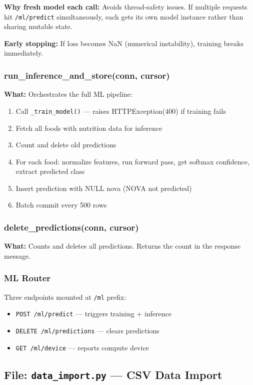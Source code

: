 \documentclass[12pt,a4paper]{article}
\begin{document}
\textbf{Why fresh model each call:} Avoids thread-safety issues. If multiple requests hit \texttt{/ml/predict} simultaneously, each gets its own model instance rather than sharing mutable state.

\textbf{Early stopping:} If loss becomes NaN (numerical instability), training breaks immediately.

\subsubsection{run\_inference\_and\_store(conn, cursor)}
\textbf{What:} Orchestrates the full ML pipeline:
\begin{enumerate}[nosep]
    \item Call \texttt{\_train\_model()} — raises HTTPException(400) if training fails
    \item Fetch all foods with nutrition data for inference
    \item Count and delete old predictions
    \item For each food: normalize features, run forward pass, get softmax confidence, extract predicted class
    \item Insert prediction with NULL nova (NOVA not predicted)
    \item Batch commit every 500 rows
\end{enumerate}

\subsubsection{delete\_predictions(conn, cursor)}
\textbf{What:} Counts and deletes all predictions. Returns the count in the response message.

\subsubsection{ML Router}
Three endpoints mounted at \texttt{/ml} prefix:
\begin{itemize}[nosep]
    \item \texttt{POST /ml/predict} — triggers training + inference
    \item \texttt{DELETE /ml/predictions} — clears predictions
    \item \texttt{GET /ml/device} — reports compute device
\end{itemize}

\subsection{File: \texttt{data\_import.py} — CSV Data Import}
\end{document}
